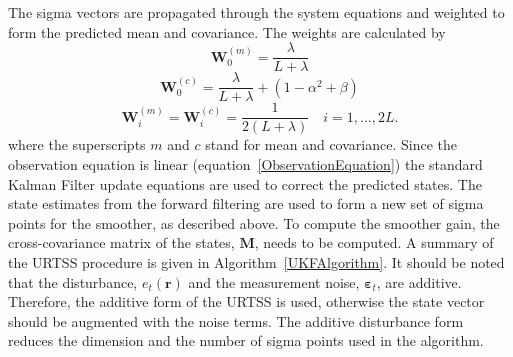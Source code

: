 \documentclass[10pt,a4paper]{article}
\begin{document}
The sigma vectors are propagated through the system equations and weighted to form the predicted mean and covariance. The weights are calculated by 
\begin{equation}
	\mathbf W_0^{(m)}=\frac{\lambda}{ L+\lambda} 
\end{equation}
\begin{equation}
	\mathbf W_0^{(c)}=\frac{\lambda}{ L+\lambda}+(1-\alpha^2+\beta) 
\end{equation}
\begin{equation}
	\mathbf W_i^{(m)}=\mathbf W_i^{(c)}=\frac{1}{2( L+\lambda)} \quad i=1, \dots, 2L. 
\end{equation}
where the superscripts $m$ and $c$ stand for mean and covariance. Since the observation equation is linear (equation~\ref{ObservationEquation}) the standard Kalman Filter update equations are used to correct the predicted states. The state estimates from the forward filtering are used to form a new set of sigma points for the smoother, as described above. To compute the smoother gain, the cross-covariance matrix of the states, $\mathbf M$, needs to be computed. A summary of the URTSS procedure is given in Algorithm~\ref{UKFAlgorithm}. It should be noted that  the disturbance, $e_t\left(\mathbf{r}\right)$ and the measurement noise, $\boldsymbol{\varepsilon}_t$, are additive. Therefore, the additive form of the URTSS is used, otherwise the state vector should be augmented with the noise terms. The additive disturbance form reduces the dimension and the number of sigma points used in the algorithm.
\end{document}
